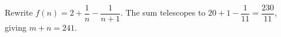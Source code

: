 Rewrite $f(n)=2+\dfrac{1}{n}-\dfrac{1}{n+1}$. The sum telescopes to $20+1-\dfrac{1}{11}=\dfrac{230}{11}$, giving $\boxed{m+n=241}$.

